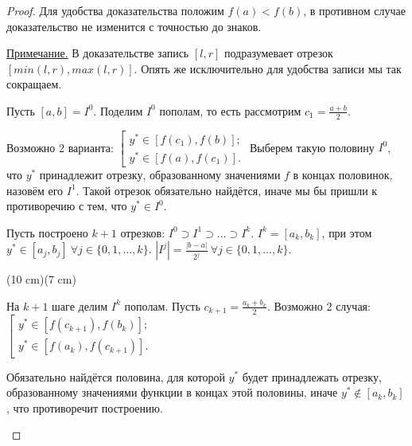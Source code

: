 \begin{proof}

    Для удобства доказательства положим $f (a) < f (b)$, в противном случае доказательство не изменится с точностью до знаков.

    \underline{Примечание.} В доказательстве запись $[l, r]$ подразумевает отрезок $[min(l, r), max(l, r)]$. Опять же исключительно для удобства записи мы так сокращаем.

    Пусть $[a, b] = I^{0}$. Поделим $I^{0}$ пополам, то есть рассмотрим $c_{1} = \frac{a + b}{2}$. 
    
    Возможно 2 варианта: $
    \left[
    \begin{gathered}
        y^{*} \in [f (c_{1}), f (b)];\\
        y^{*} \in [f (a), f (c_{1})].
    \end{gathered}
    \right.
    $
    Выберем такую половину $I^{0}$, что $y^{*}$ принадлежит отрезку, образованному значениями $f$ в концах половинок, назовём его $I^{1}$. Такой отрезок обязательно найдётся, иначе мы бы пришли к противоречию с тем, что $y^{*} \in I^{0}$.

    Пусть построено $k + 1$ отрезков: $I^{0} \supset I^{1} \supset \ldots \supset I^{k}$. $I^{k} = [a_{k}, b_{k}]$, при этом $y^{*} \in [a_{j}, b_{j}] \  \forall j \in \{0, 1, \ldots, k\}$.
    $|I^{j}| = \frac{|b - a|}{2^{j}} \  \forall j \in \{ 0, 1, \ldots, k\}$. 
    
    
\sidefig(10 cm)(7 cm)
{
\begin{flushleft}
\normalsize{
    На $k + 1$ шаге делим $I^{k}$ пополам. Пусть $c_{k + 1} = \frac{a_{k} + b_{k}}{2}$. Возможно 2 случая: $
    \left[
    \begin{gathered}
        y^{*} \in [f (c_{k + 1}), f (b_{k})];\\
        y^{*} \in [f (a_{k}), f (c_{k + 1})].
    \end{gathered}
    \right.
    $

     Обязательно найдётся половина, для которой $y^{*}$ будет принадлежать отрезку, образованному значениями функции в концах этой половины, иначе $y^{*} \notin [a_{k}, b_{k}]$, что противоречит построению.}
\end{flushleft}
}
{
    }
\end{proof}
